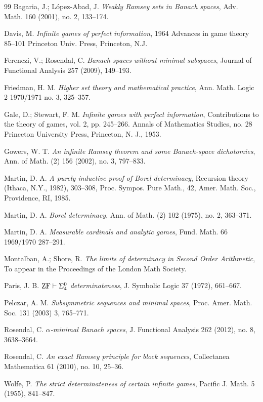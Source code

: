 \documentclass[10pt]{amsart}
\theoremstyle{definition}
\begin{document}
\begin{thebibliography}{99}
 Bagaria, J.;  L\'opez-Abad, J. {\em Weakly Ramsey sets in Banach
spaces}, Adv. Math.  160  (2001),  no. 2, 133--174.

 Davis, M. {\em Infinite games of perfect information}, 1964 Advances in game theory 85--101 Princeton Univ. Press, Princeton, N.J. 

 Ferenczi, V.; Rosendal, C. {\em Banach spaces without minimal
subspaces},  Journal of Functional Analysis 257 (2009), 149--193.


Friedman, H. M. {\em Higher set theory and mathematical practice},
Ann. Math. Logic 2 1970/1971 no. 3, 325--357.


Gale, D.; Stewart, F. M. {\em Infinite games with perfect information},  Contributions to the theory of games, vol. 2, pp. 245--266.  Annals of Mathematics Studies, no. 28 Princeton University Press, Princeton, N. J., 1953. 

  Gowers, W. T. {\em An infinite Ramsey theorem and some
Banach-space dichotomies}, Ann. of Math. (2) {156} (2002), no. 3, 797--833.


Martin, D. A. {\em A purely inductive proof of Borel determinacy}, Recursion theory (Ithaca, N.Y., 1982), 303--308, Proc. Sympos. Pure Math., 42, Amer. Math. Soc., Providence, RI, 1985.

Martin, D. A. {\em  Borel determinacy},  Ann. of Math. (2) 102 (1975), no. 2, 363--371.

Martin, D. A. {\em Measurable cardinals and analytic games},  Fund. Math. 66 1969/1970 287--291.



Montalban, A.; Shore, R. {\em The limits of determinacy in Second Order Arithmetic},  To appear in the Proceedings of the London Math Society.

 Paris, J. B. {\em $\rm{ZF}\vdash\Sigma^0_4$ determinateness},  J. Symbolic Logic 37 (1972), 661--667.


 Pelczar, A. M.  {\em Subsymmetric sequences and minimal
spaces}, Proc. Amer. Math. Soc.  131 (2003) 3, 765--771.

Rosendal, C. {\em $\alpha$-minimal Banach spaces}, J. Functional Analysis 262 (2012), no. 8, 3638--3664.

Rosendal, C. {\em An exact Ramsey principle for block sequences}, Collectanea Mathematica 61 (2010), no. 10, 25--36.


 Wolfe, P. {\em The strict determinateness of certain infinite games}, 
Pacific J. Math. 5 (1955), 841--847. 
\end{thebibliography}
\end{document}
